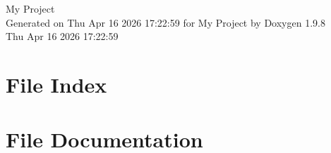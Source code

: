\documentclass[twoside]{book}
\newcommand{\+}{\discretionary{\mbox{\scriptsize$\hookleftarrow$}}{}{}}
\newcommand{\clearemptydoublepage}{%
    \newpage{\pagestyle{empty}\cleardoublepage}%
  }
\begin{document}
  \raggedbottom
    \hypersetup{pageanchor=false,
                bookmarksnumbered=true,
                pdfencoding=unicode
               }
  \begin{titlepage}
  \vspace*{7cm}
  \begin{center}%
  {\Large My Project}\\
  \vspace*{1cm}
  {\large Generated on Thu Apr 16 2026 17\+:22\+:59 for My Project by Doxygen 1.9.8}\\
    \vspace*{0.5cm}
    {\small Thu Apr 16 2026 17:22:59}
  \end{center}
  \end{titlepage}
  \clearemptydoublepage
  \tableofcontents
  \clearemptydoublepage
  \hypersetup{pageanchor=true}

\chapter{File Index}

\chapter{File Documentation}


  \backmatter
  \newpage
  \clearemptydoublepage
  \printindex
\end{document}
